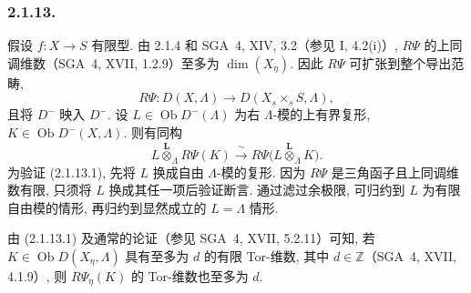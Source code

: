 \subsubsection*{2.1.13.}
假设 $f:X\longrightarrow S$ 有限型. 由 2.1.4 和 SGA~4, XIV, 3.2（参见 I, 4.2(i)）, $R\Psi$ 的上同调维数（SGA~4, XVII, 1.2.9）至多为 $\dim(X_\eta)$. 因此 $R\Psi$ 可扩张到整个导出范畴,
\[
R\Psi:D(X,\Lambda)\longrightarrow D(X_s\times_sS,\Lambda),
\]
且将 $D^-$ 映入 $D^-$. 设 $L\in\operatorname{Ob}D^-(\Lambda)$ 为右 $\Lambda$-模的上有界复形, $K\in\operatorname{Ob}D^-(X,\Lambda)$. 则有同构
\begin{equation}\tag{2.1.13.1}
L\overset{\mathbf L}{\otimes}_\Lambda R\Psi(K)
\xrightarrow{\ \sim\ }
R\Psi\bigl(L\overset{\mathbf L}{\otimes}_\Lambda K\bigr).
\end{equation}
为验证 (2.1.13.1), 先将 $L$ 换成自由 $\Lambda$-模的复形. 因为 $R\Psi$ 是三角函子且上同调维数有限, 只须将 $L$ 换成其任一项后验证断言. 通过滤过余极限, 可归约到 $L$ 为有限自由模的情形, 再归约到显然成立的 $L=\Lambda$ 情形.

由 (2.1.13.1) 及通常的论证（参见 SGA~4, XVII, 5.2.11）可知, 若 $K\in\operatorname{Ob}D(X_\eta,\Lambda)$ 具有至多为 $d$ 的有限 Tor-维数, 其中 $d\in\mathbb Z$（SGA~4, XVII, 4.1.9）, 则 $R\Psi_\eta(K)$ 的 Tor-维数也至多为 $d$.
